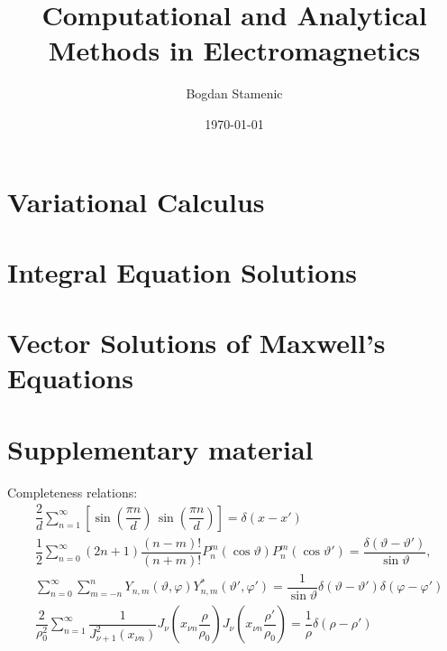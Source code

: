 

\newcommand{\FormelsammlungTitel}{Computational and Analytical Methods in Electromagnetics}
\newcommand{\FormelsammlungAutor}{Bogdan Stamenic}
\setcounter{tocdepth}{2} %


	\title{\FormelsammlungTitel}
	\author{\FormelsammlungAutor}
	\date{\today}
	\begin{multicols*}{3}
			\maketitle
			\tableofcontents
		
		
		
		
		
		\section{Variational Calculus}
        \lipsum[6]
		\section{Integral Equation Solutions}
        \lipsum[7]
		\section{Vector Solutions of Maxwell's Equations}
        \lipsum[8]
		\section{Supplementary material}
		Completeness relations:
		\begin{align*}
          &\dfrac{2}{d} \sum\limits_{n=1}^{\infty}\left[\sin\left(\dfrac{\pi n}{d}\right) \, \sin\left(\dfrac{\pi n}{d}\right) \right] = \delta(x - x')\\
		  &\dfrac{1}{2}\sum\limits_{n=0}^{\infty}(2n+1)\dfrac{(n-m)!}{(n+m)!} P_{n}^{m}(\cos\vartheta)P_{n}^{m}(\cos\vartheta') = \dfrac{\delta(\vartheta - \vartheta')}{\sin\vartheta},\\
		  &\sum\limits_{n=0}^{\infty}\sum\limits_{m=-n}^{n}Y_{n,m}(\vartheta,\varphi) Y_{n,m}^{*}(\vartheta',\varphi') = \dfrac{1}{\sin\vartheta}\delta(\vartheta-\vartheta')\delta(\varphi-\varphi')\\
		  &\dfrac{2}{\rho_{0}^{2}}\sum\limits_{n=1}^{\infty} \dfrac{1}{J_{\nu+1}^{2}(x_{\nu n})} J_{\nu}\left(x_{\nu n}\dfrac{\rho}{\rho_{0}}\right) J_{\nu}\left(x_{\nu n}\dfrac{\rho'}{\rho_{0}}\right)
			= \dfrac{1}{\rho} \delta(\rho - \rho')
		\end{align*}
	\end{multicols*}

